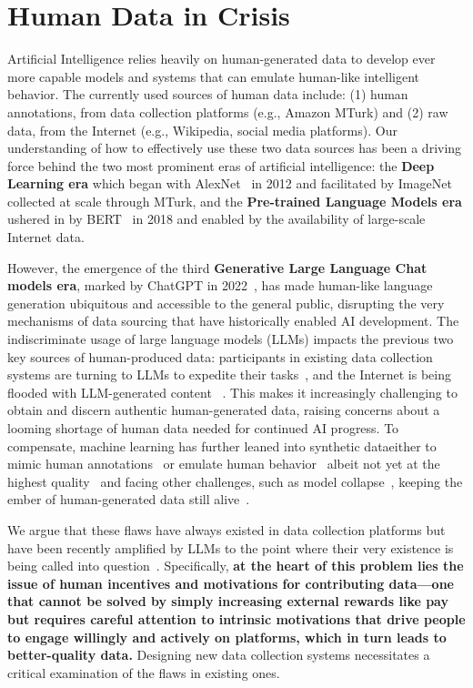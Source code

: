 \section{Human Data in Crisis}
Artificial Intelligence relies heavily on human-generated data to develop ever more capable models and systems that can emulate human-like intelligent behavior. The currently used sources of human data include: (1) human annotations, from data collection platforms (e.g., Amazon MTurk) and (2) raw data, from the Internet (e.g., Wikipedia, social media platforms). Our understanding of how to effectively use these two data sources has been a driving force behind the two most prominent eras of artificial intelligence: the \textbf{Deep Learning era} which began with AlexNet~\cite{krizhevsky2012imagenet} in 2012 and facilitated by ImageNet~\cite{deng2009imagenet} collected at scale through MTurk, and the \textbf{Pre-trained Language Models era} ushered in by BERT~\cite{devlin2018bert} in 2018 and enabled by the availability of large-scale Internet data.

However, the emergence of the third \textbf{Generative Large Language Chat models era}, marked by ChatGPT in 2022~\cite{openai2023chatgpt}, has made human-like language generation ubiquitous and accessible to the general public, disrupting the very mechanisms of data sourcing that have historically enabled AI development. The indiscriminate usage of large language models (LLMs) impacts the previous two key sources of human-produced data: participants in existing data collection systems are turning to LLMs to expedite their tasks~\cite{veselovsky2023artificial,veselovsky2023prevalence}, and the Internet is being flooded with LLM-generated content ~\cite{brooks2024rise}.
This makes it increasingly challenging to obtain and discern authentic human-generated data, raising concerns about a looming shortage of human data needed for continued AI progress.  To compensate, machine learning has further leaned into synthetic data\textemdash{}either to mimic human annotations~\cite{dubois2024alpacafarm} or emulate human behavior~\cite{argyle2023out, park2022social, park2023generative}\textemdash{} albeit not yet at the highest quality~\cite{geng2024unmet} and facing other challenges, such as model collapse~\cite{taori2023data, shumailov2024ai}, keeping the ember of human-generated data still alive~\cite{ashok2024little}.


We argue that these flaws have always existed in data collection platforms but have been recently amplified by LLMs to the point where their very existence is being called into question~\cite{pieces2025data}. Specifically,
{\bf
at the heart of this problem lies the issue of human incentives and motivations for contributing data—one that cannot be solved by simply increasing external rewards like pay but requires careful attention to intrinsic motivations that drive people to engage willingly and actively on platforms, which in turn leads to better-quality data.
} Designing new data collection systems necessitates a critical examination of the flaws in existing ones.


